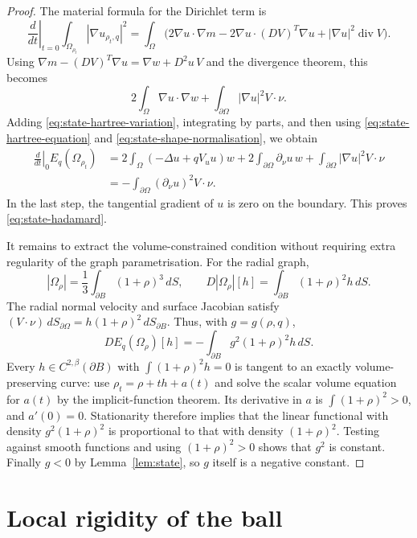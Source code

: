 \documentclass[11pt,a4paper]{article}
\theoremstyle{definition}
\theoremstyle{remark}
\begin{document}
\begin{proof}
The material formula for the Dirichlet term is
\[
 \left.\frac{d}{dt}\right|_{t=0}\int_{\Omega_{\rho_t}}
                        |\nabla u_{\rho_t,q}|^2
 =\int_\Omega\bigl(2\nabla u\cdot\nabla m
          -2\nabla u\cdot(DV)^T\nabla u
          +|\nabla u|^2\operatorname{div}V\bigr).
\]
Using
$\nabla m-(DV)^T\nabla u=\nabla w+D^2u\,V$ and the divergence
theorem, this becomes
\[
 2\int_\Omega\nabla u\cdot\nabla w
           +\int_{\partial\Omega}|\nabla u|^2V\cdot\nu.
\]
Adding \eqref{eq:state-hartree-variation}, integrating by parts, and
then using \eqref{eq:state-hartree-equation} and
\eqref{eq:state-shape-normalisation}, we obtain
\begin{align*}
 \left.\frac{d}{dt}\right|_0E_q(\Omega_{\rho_t})
 &=2\int_\Omega(-\Delta u+qV_uu)w
     +2\int_{\partial\Omega}\partial_\nu u\,w
     +\int_{\partial\Omega}|\nabla u|^2V\cdot\nu\\
 &=-\int_{\partial\Omega}(\partial_\nu u)^2V\cdot\nu.
\end{align*}
In the last step, the tangential gradient of $u$ is zero on the
boundary.  This proves \eqref{eq:state-hadamard}.

It remains to extract the volume-constrained condition without
requiring extra regularity of the graph parametrisation.  For the
radial graph,
\[
 |\Omega_\rho|=\frac13\int_{\partial B}(1+\rho)^3\,dS,
 \qquad
 D|\Omega_\rho|[h]=\int_{\partial B}(1+\rho)^2h\,dS.
\]
The radial normal velocity and surface Jacobian satisfy
$ (V\cdot\nu)\,dS_{\partial\Omega}
      =h(1+\rho)^2\,dS_{\partial B}$.
Thus, with $g=g(\rho,q)$,
\[
 DE_q(\Omega_\rho)[h]
       =-\int_{\partial B}g^2(1+\rho)^2h\,dS.
\]
Every $h\in C^{2,\beta}(\partial B)$ with
$\int(1+\rho)^2h=0$ is tangent to an exactly volume-preserving
curve: use $\rho_t=\rho+th+a(t)$ and solve the scalar volume equation
for $a(t)$ by the implicit-function theorem.  Its derivative in
$a$ is $\int(1+\rho)^2>0$, and $a'(0)=0$.
Stationarity therefore implies that the linear functional with
density $g^2(1+\rho)^2$ is proportional to that with density
$(1+\rho)^2$.  Testing against smooth functions and using
$(1+\rho)^2>0$ shows that $g^2$ is constant.  Finally
$g<0$ by Lemma~\ref{lem:state}, so $g$ itself is a negative constant.
\end{proof}

\section{Local rigidity of the ball}\label{sec:local}
\end{document}
